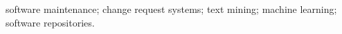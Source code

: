 \begin{IEEEkeywords}
software maintenance; change request systems; text mining; machine learning; software repositories.
\end{IEEEkeywords}